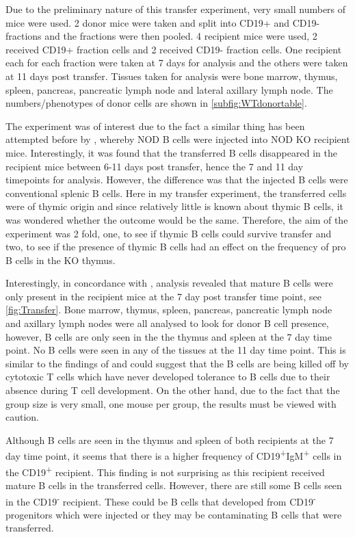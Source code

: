 Due to the preliminary nature of this transfer experiment, very small numbers of mice were used.
2 donor mice were taken and split into CD19+ and CD19- fractions and the fractions were then pooled.
4 recipient mice were used, 2 received CD19+ fraction cells and 2 received CD19- fraction cells.
One recipient each for each fraction were taken at 7 days for analysis and the others were taken at 11 days post transfer.
Tissues taken for analysis were bone marrow, thymus, spleen, pancreas, pancreatic lymph node and lateral axillary lymph node.
The numbers/phenotypes of donor cells are shown in \cref{subfig:WTdonortable}.



The experiment was of interest due to the fact a similar thing has been attempted before by \citet{Serreze1998}, whereby NOD B cells were injected into NOD KO recipient mice.
Interestingly, it was found that the transferred B cells disappeared in the recipient mice between 6-11 days post transfer, hence the 7 and 11 day timepoints for analysis.
However, the difference was that the injected B cells were conventional splenic B cells.
Here in my transfer experiment, the transferred cells were of thymic origin and since relatively little is known about thymic B cells, it was wondered whether the outcome would be the same. 
Therefore, the aim of the experiment was 2 fold, one, to see if thymic B cells could survive transfer and two, to see if the presence of thymic B cells had an effect on the frequency of pro B cells in the KO thymus.

Interestingly, in concordance with \citet{Serreze1998}, analysis revealed that mature B cells were only present in the recipient mice at the 7 day post transfer time point, see \cref{fig:Transfer}.
Bone marrow, thymus, spleen, pancreas, pancreatic lymph node and axillary lymph nodes were all analysed to look for donor B cell presence, however, B cells are only seen in the the thymus and spleen at the 7 day time point.
No B cells were seen in any of the tissues at the 11 day time point.
This is similar to the findings of \citet{Serreze1998} and could suggest that the B cells are being killed off by cytotoxic T cells which have never developed tolerance to B cells due to their absence during T cell development.
On the other hand, due to the fact that the group size is very small, one mouse per group, the results must be viewed with caution.

Although B cells are seen in the thymus and spleen of both recipients at the 7 day time point, it seems that there is a higher frequency of CD19\textsuperscript{+}IgM\textsuperscript{+} cells in the CD19\textsuperscript{+} recipient.
This finding is not surprising as this recipient received mature B cells in the transferred cells.
However, there are still some B cells seen in the CD19\textsuperscript{-} recipient.
These could be B cells that developed from CD19\textsuperscript{-} progenitors which were injected or they may be contaminating B cells that were transferred.

